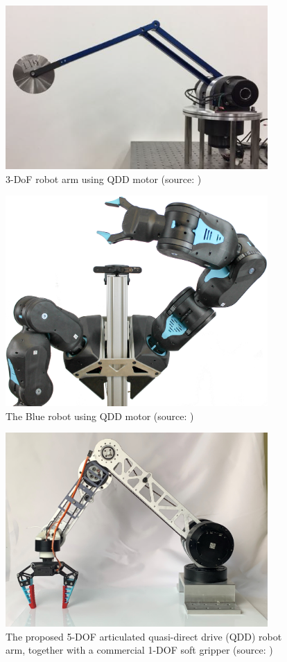 \begin{figure}[h]
  \centering
  \includegraphics[width=10cm]{images/haikei/3DofArm.png}
  \caption[3-DoF robot arm using QDD motor]{3-DoF robot arm using QDD motor (source: \cite{飯塚浩太2021})}
  \label{fig:3DofArm}
\end{figure}
\begin{figure}[h]
  \centering
  \includegraphics[width=10cm]{images/haikei/twoArmTeaser.jpg}
  \caption[The Blue robot using QDD motor]{The Blue robot using QDD motor (source: \cite{Blue:online})}
  \label{fig:blue}
\end{figure}
\begin{figure}[h]
  \centering
  \includegraphics[width=10cm]{images/haikei/qddarm.png}
  \caption[The proposed 5-DOF articulated quasi-direct drive (QDD) robot arm,
  together with a commercial 1-DOF soft gripper]{The proposed 5-DOF articulated quasi-direct drive (QDD) robot arm,
  together with a commercial 1-DOF soft gripper (source: \cite{10106520})}
  \label{fig:qddarm}
\end{figure}
\clearpage